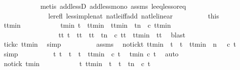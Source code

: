 \begin{isabellebody}
\ \ \ \ \ \ \ \ \ \ \isamarkupfalse%
\ {\isacharparenleft}metis\ add{\isacharunderscore}lessD{}\ add{\isacharunderscore}less{\isacharunderscore}mono{}\ assms\ le{\isacharunderscore}eq{\isacharunderscore}less{\isacharunderscore}or{\isacharunderscore}eq\isanewline
\ \ \ \ \ \ \ \ \ \ \ \ \ \ le{\isacharunderscore}refl\ less{\isacharunderscore}imp{\isacharunderscore}le{\isacharunderscore}nat\ nat{\isacharunderscore}le{\isacharunderscore}iff{\isacharunderscore}add\ nat{\isacharunderscore}le{\isacharunderscore}linear{\isacharparenright}\isanewline
\ \ \ \ \ \ \ \ \isamarkupfalse%
\ this\ \isamarkupfalse%
\ ttmin\ \isanewline
\ \ \ \ \ \ \ \ \ \ tmin{\isacharcolon}\ {\isacartoucheopen}t\ {\isacharless}\ ttmin\ {\isasymand}\ ttmin\ {\isasymle}\ t{\isacharplus}n\ {\isasymand}\ c\ ttmin\isanewline
\ \ \ \ \ \ \ \ \ \ \ \ \ \ \ \ {\isasymand}\ {\isacharparenleft}{\isasymforall}tt{\isacharprime}{\isachardot}\ {\isacharparenleft}t\ {\isacharless}\ tt{\isacharprime}\ {\isasymand}\ tt{\isacharprime}\ {\isasymle}\ t{\isacharplus}n\ {\isasymand}\ c\ tt{\isacharprime}{\isacharparenright}\ {\isasymlongrightarrow}\ ttmin\ {\isasymle}\ tt{\isacharprime}{\isacharparenright}{\isacartoucheclose}\ \isamarkupfalse%
\ blast\isanewline
\ \ \ \ \ \ \ \ \isamarkupfalse%
\ tick{\isacharcolon}{\isacartoucheopen}c\ ttmin{\isacartoucheclose}\ \isamarkupfalse%
\ simp\isanewline
\ \ \ \ \ \ \ \ \isamarkupfalse%
\ assms\ \isamarkupfalse%
\ notick{\isacharcolon}{\isacartoucheopen}{\isacharparenleft}{\isasymforall}t{\isacharprime}{\isachardot}\ ttmin\ {\isacharless}\ t{\isacharprime}\ {\isasymand}\ t{\isacharprime}\ {\isasymle}\ ttmin\ {\isacharplus}\ n\ {\isasymlongrightarrow}\ {\isasymnot}\ c\ t{\isacharprime}{\isacharparenright}{\isacartoucheclose}\ \isamarkupfalse%
\ simp\isanewline
\ \ \ \ \ \ \ \ \isamarkupfalse%
\ {\isacartoucheopen}{\isasymforall}t{\isacharprime}{\isachardot}\ {\isacharparenleft}t\ {\isacharless}\ t{\isacharprime}\ {\isasymand}\ t{\isacharprime}\ {\isacharless}\ ttmin{\isacharparenright}\ {\isasymlongrightarrow}\ {\isasymnot}c\ t{\isacharprime}{\isacartoucheclose}\ \isamarkupfalse%
\ tmin\ {\isacartoucheopen}{\isasymnot}c\ t{\isacartoucheclose}\ \isamarkupfalse%
\ auto\isanewline
\ \ \ \ \ \ \ \ \isamarkupfalse%
\ \isamarkupfalse%
\ notick\ tmin\ \isamarkupfalse%
\isanewline
\ \ \ \ \ \ \ \ \ \ {\isacartoucheopen}{\isasymforall}t{\isacharprime}{\isachardot}\ {\isacharparenleft}ttmin\ {\isacharless}\ t{\isacharprime}\ {\isasymand}\ t{\isacharprime}\ {\isasymle}\ t{\isacharplus}n{\isacharparenright}\ {\isasymlongrightarrow}\ {\isasymnot}c\ t{\isacharprime}{\isacartoucheclose}\ \isamarkupfalse%

\end{isabellebody}
